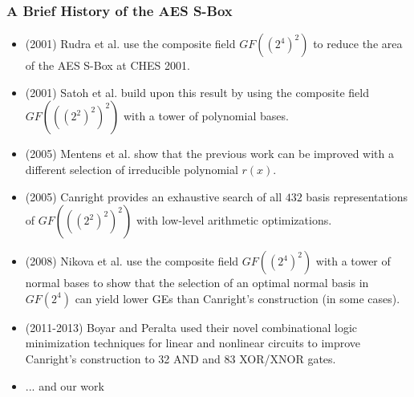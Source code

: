 \documentclass[10pt]{beamer}
\begin{document}
\begin{frame}
	\frametitle{A Brief History of the AES S-Box}
	\begin{itemize}
		\item (2001) Rudra et al. use the composite field $GF((2^4)^2)$ to reduce the area of the AES S-Box at CHES 2001.
		\pause
		\item (2001) Satoh et al. build upon this result by using the composite field $GF(((2^2)^2)^2)$ with a tower of polynomial bases.
		\pause
		\item(2005) Mentens et al. show that the previous work can be improved with a different selection of irreducible polynomial $r(x)$.
		\pause
		\item (2005) Canright provides an exhaustive search of all $432$ basis representations of $GF(((2^2)^2)^2)$ with low-level arithmetic optimizations.
		\pause
		\item (2008) Nikova et al. use the composite field $GF((2^4)^2)$ with a tower of normal bases to show that the selection of an optimal normal basis in $GF(2^4)$ can yield lower GEs than Canright's construction (in some cases).
		\pause
		\item (2011-2013) Boyar and Peralta used their novel combinational logic minimization techniques for linear and nonlinear circuits to improve Canright's construction to 32 AND and 83 XOR/XNOR gates.
		\item ... and our work
	\end{itemize}
\end{frame}
\end{document}
